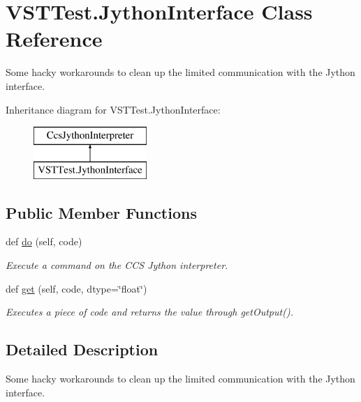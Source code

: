 \hypertarget{class_v_s_t_test_1_1_jython_interface}{}\section{V\+S\+T\+Test.\+Jython\+Interface Class Reference}
\label{class_v_s_t_test_1_1_jython_interface}


Some hacky workarounds to clean up the limited communication with the Jython interface.  


Inheritance diagram for V\+S\+T\+Test.\+Jython\+Interface\+:\begin{figure}[H]
\begin{center}
\leavevmode
\includegraphics[height=2.000000cm]{class_v_s_t_test_1_1_jython_interface}
\end{center}
\end{figure}
\subsection*{Public Member Functions}
\begin{DoxyCompactItemize}
\item 
def \hyperlink{class_v_s_t_test_1_1_jython_interface_a15c370c16f9bace76aed9c8d1c814233}{do} (self, code)
\begin{DoxyCompactList}\small\item\em Execute a command on the C\+CS Jython interpreter. \end{DoxyCompactList}\item 
def \hyperlink{class_v_s_t_test_1_1_jython_interface_a8c33995ad28358dec6bb5ab3384fc320}{get} (self, code, dtype=\char`\"{}float\char`\"{})
\begin{DoxyCompactList}\small\item\em Executes a piece of code and returns the value through get\+Output(). \end{DoxyCompactList}\end{DoxyCompactItemize}


\subsection{Detailed Description}
Some hacky workarounds to clean up the limited communication with the Jython interface. 



